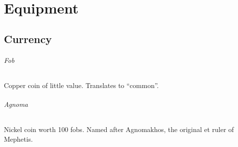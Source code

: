 \chapter{Equipment} \label{ch::equipment}
\section{Currency} \label{sec::currency}
\subparagraph{Fob}
    Copper coin of little value.
    Translates to ``common''.
\subparagraph{Agnoma}
    Nickel coin worth 100 fobs.
    Named after Agnomakhos, the original et ruler of Mephetis.









